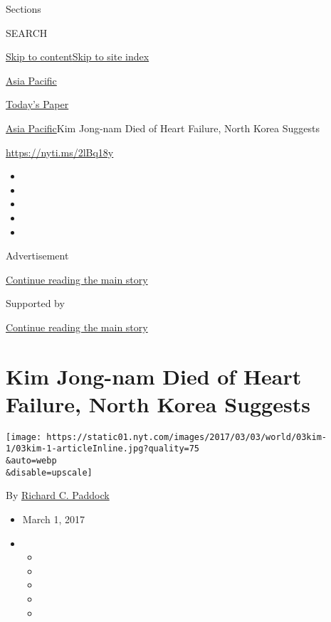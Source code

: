 Sections

SEARCH

\protect\hyperlink{site-content}{Skip to
content}\protect\hyperlink{site-index}{Skip to site index}

\href{https://www.nytimes.com/section/world/asia}{Asia Pacific}

\href{https://myaccount.nytimes.com/auth/login?response_type=cookie\&client_id=vi}{}

\href{https://www.nytimes.com/section/todayspaper}{Today's Paper}

\href{/section/world/asia}{Asia Pacific}\textbar{}Kim Jong-nam Died of
Heart Failure, North Korea Suggests

\url{https://nyti.ms/2lBq18y}

\begin{itemize}
\item
\item
\item
\item
\item
\end{itemize}

Advertisement

\protect\hyperlink{after-top}{Continue reading the main story}

Supported by

\protect\hyperlink{after-sponsor}{Continue reading the main story}

\hypertarget{kim-jong-nam-died-of-heart-failure-north-korea-suggests}{%
\section{Kim Jong-nam Died of Heart Failure, North Korea
Suggests}\label{kim-jong-nam-died-of-heart-failure-north-korea-suggests}}

\texttt{[image: https://static01.nyt.com/images/2017/03/03/world/03kim-1/03kim-1-articleInline.jpg?quality=75\\\&auto=webp\\\&disable=upscale]}

By \href{https://www.nytimes.com/by/richard-c-paddock}{Richard C.
Paddock}

\begin{itemize}
\item
  March 1, 2017
\item
  \begin{itemize}
  \item
  \item
  \item
  \item
  \item
  \end{itemize}
\end{itemize}

